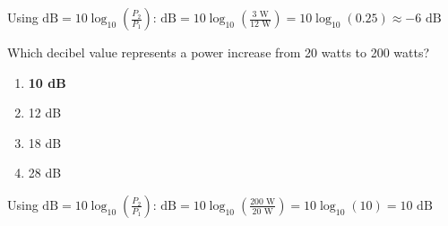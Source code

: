 Using $\text{dB} = 10 \log_{10}(\frac{P_2}{P_1})$:
$\text{dB} = 10 \log_{10}(\frac{3\text{ W}}{12\text{ W}}) = 10 \log_{10}(0.25) \approx -6\text{ dB}$

\begin{tcolorbox}[colback=gray!10!white,colframe=black!75!black,title={T5B11}]
Which decibel value represents a power increase from 20 watts to 200 watts?
\begin{enumerate}[label=\Alph*),noitemsep]
    \item \textbf{10 dB}
    \item 12 dB
    \item 18 dB
    \item 28 dB
\end{enumerate}
\end{tcolorbox}

Using $\text{dB} = 10 \log_{10}(\frac{P_2}{P_1})$:
$\text{dB} = 10 \log_{10}(\frac{200\text{ W}}{20\text{ W}}) = 10 \log_{10}(10) = 10\text{ dB}$
